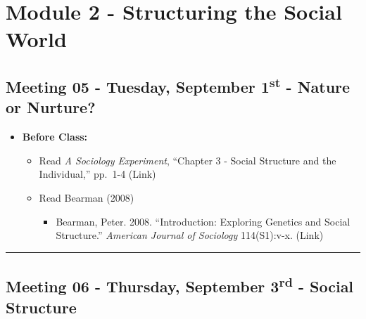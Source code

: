 \documentclass[
]{book}
\providecommand{\tightlist}{%
  \setlength{\itemsep}{0pt}\setlength{\parskip}{0pt}}
\begin{document}
\newpage

\hypertarget{module-2---structuring-the-social-world}{%
\section{Module 2 - Structuring the Social World}\label{module-2---structuring-the-social-world}}

\hypertarget{meeting-05---tuesday-september-1st---nature-or-nurture}{%
\subsection*{\texorpdfstring{Meeting 05 - Tuesday, September 1\textsuperscript{st} - Nature or Nurture?}{Meeting 05 - Tuesday, September 1st - Nature or Nurture?}}\label{meeting-05---tuesday-september-1st---nature-or-nurture}}

\begin{itemize}
\tightlist
\item
  \textbf{Before Class:}

  \begin{itemize}
  \tightlist
  \item
    Read \emph{A Sociology Experiment}, ``Chapter 3 - Social Structure and the Individual,'' pp.~1-4 (Link)
  \item
    Read Bearman (2008)

    \begin{itemize}
    \tightlist
    \item
      Bearman, Peter. 2008. ``Introduction: Exploring Genetics and Social Structure.'' \emph{American Journal of Sociology} 114(S1):v-x. (Link)
    \end{itemize}
  \end{itemize}
\end{itemize}

\begin{center}\rule{0.5\linewidth}{0.5pt}\end{center}

\hypertarget{meeting-06---thursday-september-3rd---social-structure}{%
\subsection*{\texorpdfstring{Meeting 06 - Thursday, September 3\textsuperscript{rd} - Social Structure}{Meeting 06 - Thursday, September 3rd - Social Structure}}\label{meeting-06---thursday-september-3rd---social-structure}}
\end{document}

